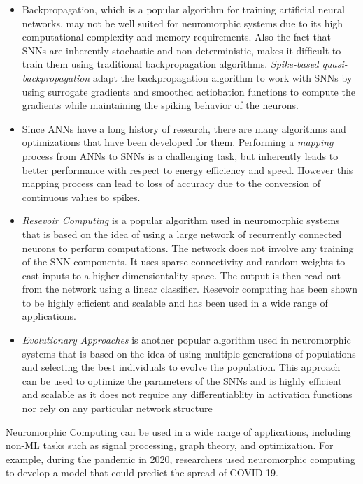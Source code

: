 \documentclass[screen, acmtog]{acmart}
\begin{document}
\begin{itemize}
    \item Backpropagation, which is a popular algorithm for training artificial neural networks, may not be well suited for neuromorphic systems due to its high computational complexity and memory requirements. Also the fact that SNNs are inherently stochastic and non-deterministic, makes it difficult to train them using traditional backpropagation algorithms. \textit{Spike-based quasi-backpropagation} adapt the backpropagation algorithm to work with SNNs by using surrogate gradients and smoothed actiobation functions to compute the gradients while maintaining the spiking behavior of the neurons.
    \item Since ANNs have a long history of research, there are many algorithms and optimizations that have been developed for them. Performing a \textit{mapping} process from ANNs to SNNs is a challenging task, but inherently leads to better performance with respect to energy efficiency and speed. However this mapping process can lead to loss of accuracy due to the conversion of continuous values to spikes. 
    \item \textit{Resevoir Computing} is a popular algorithm used in neuromorphic systems that is based on the idea of using a large network of recurrently connected neurons to perform computations. The network does not involve any training of the SNN components. It uses sparse connectivity and random weights to cast inputs to a higher dimensiontality space. The output is then read out from the network using a linear classifier. Resevoir computing has been shown to be highly efficient and scalable and has been used in a wide range of applications.
    \item \textit{Evolutionary Approaches} is another popular algorithm used in neuromorphic systems that is based on the idea of using multiple generations of populations and selecting the best individuals to evolve the population. This approach can be used to optimize the parameters of the SNNs and is highly efficient and scalable as it does not require any differentiablity in activation functions nor rely on any particular network structure
\end{itemize}

Neuromorphic Computing can be used in a wide range of applications, including non-ML tasks such as signal processing, graph theory, and optimization. For example, during the pandemic in 2020, researchers used neuromorphic computing to develop a model that could predict the spread of COVID-19. 
\end{document}
